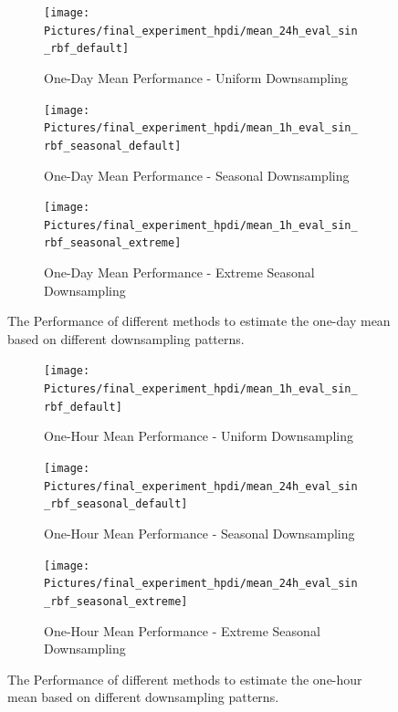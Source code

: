 \begin{figure}[!ht]
\centering
\begin{subfigure}{\textwidth}
    \centering
    \texttt{[image: Pictures/final\_experiment\_hpdi/mean\_24h\_eval\_sin\_rbf\_default]}
    \caption{One-Day Mean Performance - Uniform Downsampling}
    \label{fig:daily-mean-uniform-sampling-performance}
\end{subfigure}

\bigskip

\begin{subfigure}{\textwidth}
    \centering
    \texttt{[image: Pictures/final\_experiment\_hpdi/mean\_1h\_eval\_sin\_rbf\_seasonal\_default]}
    \caption{One-Day Mean Performance - Seasonal Downsampling}
    \label{fig:daily-mean-seasonal-sampling-performance}
\end{subfigure}

\bigskip

\begin{subfigure}{\textwidth}
    \centering
    \texttt{[image: Pictures/final\_experiment\_hpdi/mean\_1h\_eval\_sin\_rbf\_seasonal\_extreme]}
    \caption{One-Day Mean Performance - Extreme Seasonal Downsampling}
    \label{fig:daily-mean-extreme-seasonal-sampling-performance}
\end{subfigure}

\caption[One-Day Mean Performance]{The Performance of different methods to
estimate the one-day mean based on different downsampling patterns.
}
\label{fig:daily-mean-performance}
\end{figure}




\begin{figure}[!ht]
\centering
\begin{subfigure}{\textwidth}
    \centering
    \texttt{[image: Pictures/final\_experiment\_hpdi/mean\_1h\_eval\_sin\_rbf\_default]}
    \caption{One-Hour Mean Performance - Uniform Downsampling}
    \label{fig:hourly-mean-uniform-sampling-performance}
\end{subfigure}

\bigskip

\begin{subfigure}{\textwidth}
    \centering
    \texttt{[image: Pictures/final\_experiment\_hpdi/mean\_24h\_eval\_sin\_rbf\_seasonal\_default]}
    \caption{One-Hour Mean Performance - Seasonal Downsampling}
    \label{fig:hourly-mean-seasonal-sampling-performance}
\end{subfigure}

\bigskip

\begin{subfigure}{\textwidth}
    \centering
    \texttt{[image: Pictures/final\_experiment\_hpdi/mean\_24h\_eval\_sin\_rbf\_seasonal\_extreme]}
    \caption{One-Hour Mean Performance - Extreme Seasonal Downsampling}
    \label{fig:hourly-mean-extreme-seasonal-sampling-performance}
\end{subfigure}

\caption[One-Hour Mean Performance]{The Performance of different methods to
estimate the one-hour mean based on different downsampling patterns.
}
\label{fig:hourly-mean-performance}
\end{figure}


